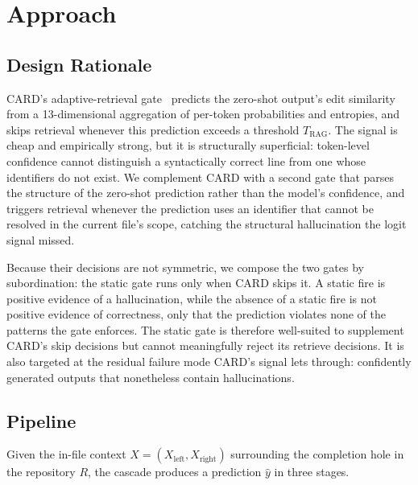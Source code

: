\documentclass[10pt,conference]{IEEEtran}
\newcommand{\rev}[1]{{\color{red}#1}}
\begin{document}
\section{Approach}
\label{sec:approach}

\subsection{Design Rationale}

CARD's adaptive-retrieval gate~\cite{zhang2024card} predicts the
zero-shot output's edit similarity from a 13-dimensional aggregation of
per-token probabilities and entropies, and skips retrieval whenever this
prediction exceeds a threshold $T_{\text{RAG}}$. The signal is cheap and
empirically strong, but it is structurally superficial: token-level
confidence cannot distinguish a syntactically correct line from one whose
identifiers do not exist. We complement
CARD with a second gate that parses the structure of the
zero-shot prediction rather than the model's confidence, and triggers
retrieval whenever \rev{the prediction uses an identifier that cannot be
resolved in the current file's scope, catching the structural hallucination} the
logit signal missed.

Because their decisions are not symmetric, we compose the two gates by subordination: the static gate runs only when CARD skips it. A static fire is positive evidence of a hallucination, while the absence of a static fire is not positive evidence
of correctness, only that the prediction violates none of the patterns the gate enforces.
The static gate is therefore well-suited to supplement CARD's skip
decisions but cannot meaningfully reject its retrieve decisions. It is
also targeted at the residual failure mode CARD's
signal lets through: confidently generated outputs that nonetheless
contain hallucinations.

\subsection{Pipeline}

Given the in-file context $X = (X_{\text{left}}, X_{\text{right}})$
surrounding the completion hole in the repository $R$, the cascade
produces a prediction $\hat{y}$ in three stages.
\end{document}
